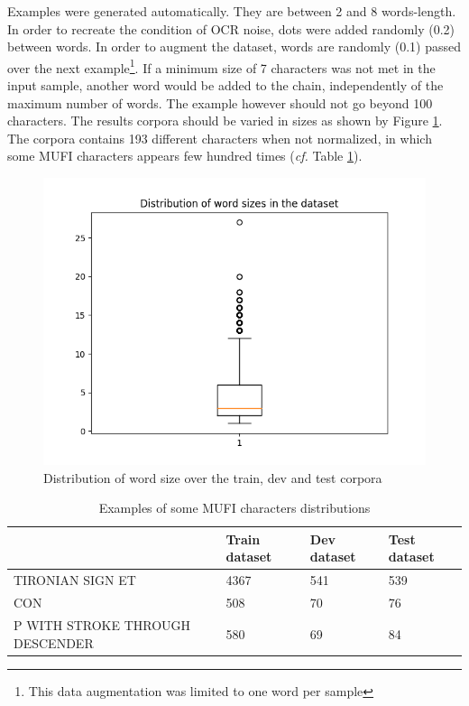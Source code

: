 \documentclass{jdmdh}
\begin{document}
Examples were generated automatically. They are between 2 and 8 words-length. In order to recreate the condition of OCR noise, dots were added randomly (0.2) between words. In order to augment the dataset, words are randomly (0.1) passed over the next example\footnote{This data augmentation was limited to one word per sample}. If a minimum size of 7 characters was not met in the input sample, another word would be added to the chain, independently of the maximum number of words. The example however should not go beyond 100 characters. The results corpora should be varied in sizes as shown by Figure \ref{fig:word_sizes}. The corpora contains 193 different characters when not normalized, in which some MUFI characters appears few hundred times (\textit{cf.} Table \ref{tab:mufi_examples}).

\begin{figure}[!ht]
  \centering
  \includegraphics[width=\linewidth]{length.png}
  \caption{Distribution of word size over the train, dev and test corpora}
  \label{fig:word_sizes}
\end{figure}

\begin{table}[!ht]
\begin{tabular}{llll}
\hline
                                                   & Train dataset & Dev dataset & Test dataset \\ \hline
TIRONIAN SIGN ET                                   & 4367          & 541         & 539          \\
CON                             & 508           & 70          & 76           \\
P WITH STROKE THROUGH DESCENDER & 580           & 69          & 84           \\ \hline
\end{tabular}
  \caption{Examples of some MUFI characters distributions}
  \label{tab:mufi_examples}
\end{table}
\end{document}

